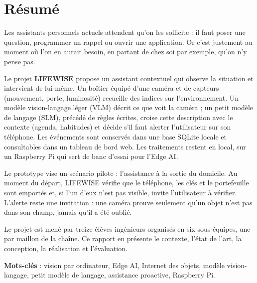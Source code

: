 \chapter*{\textcolor{mycolor}{Résumé}}

Les assistants personnels actuels attendent qu'on les sollicite : il faut poser une question, programmer un
rappel ou ouvrir une application. Or c'est justement au moment où l'on en aurait besoin, en partant de chez soi
par exemple, qu'on n'y pense pas.

Le projet \textbf{LIFEWISE} propose un assistant contextuel qui observe la situation et intervient de lui-même.
Un boîtier équipé d'une caméra et de capteurs (mouvement, porte, luminosité) recueille des indices sur
l'environnement. Un modèle vision-langage léger (VLM) décrit ce que voit la caméra ; un petit modèle de langage
(SLM), précédé de règles écrites, croise cette description avec le contexte (agenda, habitudes) et décide s'il
faut alerter l'utilisateur sur son téléphone. Les événements sont conservés dans une base SQLite locale et
consultables dans un tableau de bord web. Les traitements restent en local, sur un Raspberry Pi qui sert de banc
d'essai pour l'Edge AI.

Le prototype vise un scénario pilote : l'assistance à la sortie du domicile. Au moment du départ, LIFEWISE vérifie
que le téléphone, les clés et le portefeuille sont emportés et, si l'un d'eux n'est pas visible, invite
l'utilisateur à vérifier. L'alerte reste une invitation : une caméra prouve seulement qu'un objet n'est pas dans
son champ, jamais qu'il a été oublié.

Le projet est mené par treize élèves ingénieurs organisés en six sous-équipes, une par maillon de la chaîne.
Ce rapport en présente le contexte, l'état de l'art, la conception, la réalisation et l'évaluation.

\vspace{1cm}

\noindent\textbf{Mots-clés} : vision par ordinateur, Edge AI, Internet des objets, modèle vision-langage,
petit modèle de langage, assistance proactive, Raspberry Pi.
